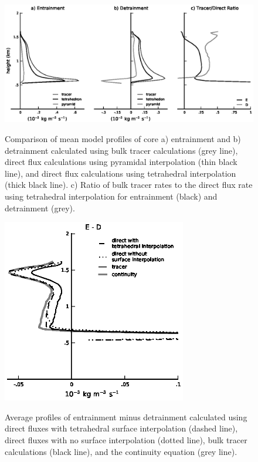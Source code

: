 \documentclass[12pt]{article}
\begin{document}
\begin{figure}[t]
  \noindent\includegraphics[width=40pc,angle=0]{./figures/direct_vs_tracer_core.eps}\\
  \caption{Comparison of mean model profiles of core a) entrainment and b) 
detrainment calculated using bulk tracer calculations (grey line), direct flux
calculations using pyramidal interpolation (thin black line), and direct flux
calculations using tetrahedral interpolation (thick black line).  c) Ratio of 
bulk tracer rates to the direct flux rate using tetrahedral interpolation for
entrainment (black) and detrainment (grey).}\label{fig:direct_vs_tracer}
\end{figure}

\begin{figure}[t]
  \noindent\includegraphics[width=19pc,angle=0]{./figures/E_minus_D_core.eps}\\
  \caption{Average profiles of entrainment minus detrainment calculated using 
direct fluxes with tetrahedral surface interpolation (dashed line), direct 
fluxes with no surface interpolation (dotted line), bulk tracer calculations 
(black line), and the continuity equation (grey line).}\label{fig:E_minus_D}
\end{figure}
\end{document}

